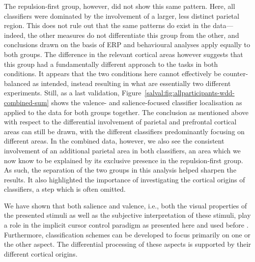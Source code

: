The repulsion-first group, however, did not show this same pattern. Here, all classifiers were dominated by the involvement of a larger, less distinct parietal region. This does not rule out that the same patterns do exist in the data---indeed, the other measures do not differentiate this group from the other, and conclusions drawn on the basis of ERP and behavioural analyses apply equally to both groups. The difference in the relevant cortical areas however suggests that this group had a fundamentally different approach to the tasks in both conditions. It appears that the two conditions here cannot effectively be counter-balanced as intended, instead resulting in what are essentially two different experiments. Still, as a last validation, Figure~\ref{salval:fig:allparticipants-wdd-combined-sum} shows the valence- and salience-focused classifier localisation as applied to the data for both groups together. The conclusion as mentioned above with respect to the differential involvement of parietal and prefrontal cortical areas can still be drawn, with the different classifiers predominantly focusing on different areas. In the combined data, however, we also see the consistent involvement of an additional parietal area in both classifiers, an area which we now know to be explained by its exclusive presence in the repulsion-first group. As such, the separation of the two groups in this analysis helped sharpen the results. It also highlighted the importance of investigating the cortical origins of classifiers, a step which is often omitted.

We have shown that both salience and valence, i.e., both the visual properties of the presented stimuli as well as the subjective interpretation of these stimuli, play a role in the implicit cursor control paradigm as presented here and used before \cite{zander2014implicit,zander2016nat}. Furthermore, classification schemes can be developed to focus primarily on one or the other aspect. The differential processing of these aspects is supported by their different cortical origins.

